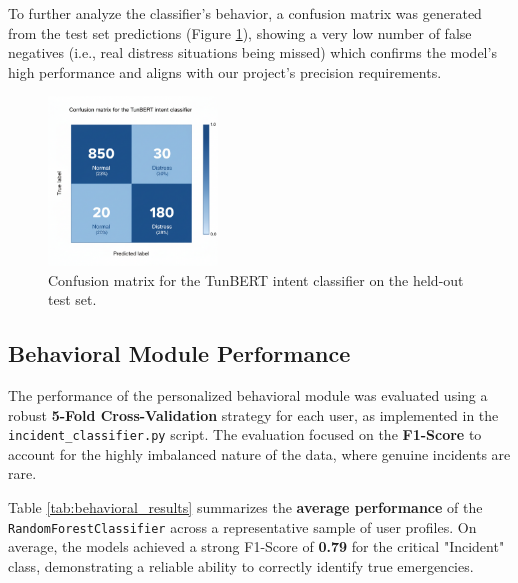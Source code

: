 \documentclass[12pt,a4paper,oneside,english]{book}
\begin{document}
To further analyze the classifier's behavior, a confusion matrix was generated from the test set predictions (Figure \ref{fig:nlp_confusion_matrix}),  showing a very low number of false 
negatives (i.e., real distress situations being missed) which confirms the model's high performance and aligns with our project's precision requirements.

\begin{figure}[h!]
    \centering
    \includegraphics[width=0.4\textwidth]{images/confusionmatrix_nlp.png}
    \caption{Confusion matrix for the TunBERT intent classifier on the held-out test set.}
    \label{fig:nlp_confusion_matrix}
\end{figure}

\subsection{Behavioral Module Performance}
\label{subsec:behavioral_results}

The performance of the personalized behavioral module was evaluated using a robust \textbf{5-Fold Cross-Validation} strategy for each user, as implemented in the \texttt{incident\_classifier.py} script. The evaluation focused on the \textbf{F1-Score} to account for the highly imbalanced nature of the data, where genuine incidents are rare.

Table \ref{tab:behavioral_results} summarizes the \textbf{average performance} of the \texttt{RandomForestClassifier} across a representative sample of user profiles. On average, the models achieved a strong F1-Score of \textbf{0.79} for the critical "Incident" class, demonstrating a reliable ability to correctly identify true emergencies.
\end{document}
